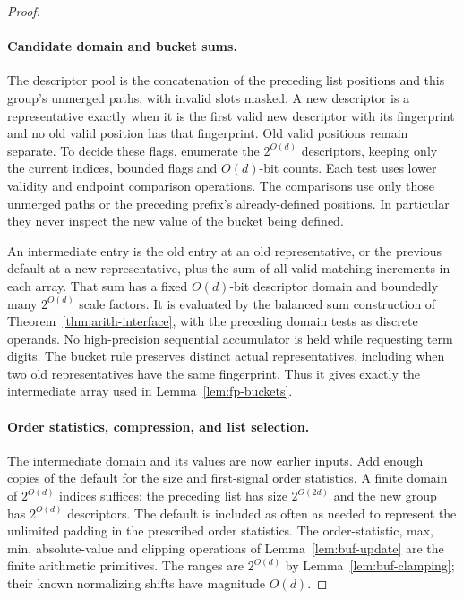 \begin{proof}
\paragraph{Candidate domain and bucket sums.}
The descriptor pool is the concatenation of the preceding list positions
and this group's unmerged paths, with invalid slots masked.  A new
descriptor is a representative exactly when it is the first valid
new descriptor with its fingerprint and no old valid position has that fingerprint.
Old valid positions remain separate.  To decide these flags, enumerate
the $2^{O(d)}$ descriptors, keeping only the current indices, bounded
flags and $O(d)$-bit counts.  Each test uses lower validity and endpoint
comparison operations.  The comparisons use only those unmerged paths
or the preceding prefix's already-defined positions.  In particular
they never inspect the new value of the bucket being defined.

An intermediate entry is the old entry at an old representative, or
the previous default at a new representative, plus the sum of all
valid matching increments in each array.  That sum has a fixed
$O(d)$-bit descriptor domain and boundedly many $2^{O(d)}$ scale
factors.  It is evaluated by the balanced sum construction of
Theorem~\ref{thm:arith-interface}, with the preceding domain tests as
discrete operands.  No high-precision sequential accumulator is held
while requesting term digits.  The bucket rule preserves distinct
actual representatives, including when two old representatives have
the same fingerprint.  Thus it gives exactly the intermediate array used in
Lemma~\ref{lem:fp-buckets}.

\begingroup
{}
\paragraph{Order statistics, compression, and list selection.}
The intermediate domain and its values are now earlier inputs.  Add
enough copies of the default for the size and first-signal order statistics.  A
finite domain of $2^{O(d)}$ indices suffices: the preceding list has
size $2^{O(2d)}$ and the new group has $2^{O(d)}$ descriptors.  The
default is included as often as needed to represent the unlimited
padding in the prescribed order statistics.  The order-statistic, max, min, absolute-value
and clipping operations of Lemma~\ref{lem:buf-update} are the finite
arithmetic primitives.  The ranges are $2^{O(d)}$ by
Lemma~\ref{lem:buf-clamping}; their known normalizing shifts have
magnitude $O(d)$.
\par\endgroup


\end{proof}
